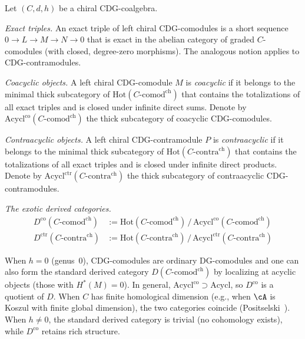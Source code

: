 \begin{definition}
\label{def:chiral-coderived}
Let $(C, d, h)$ be a chiral CDG-coalgebra.

\emph{Exact triples.}
An exact triple of left chiral CDG-comodules is a short sequence
$0 \to L \to M \to N \to 0$ that is exact in the abelian category
of graded $C$-comodules (with closed, degree-zero morphisms).
The analogous notion applies to CDG-contramodules.

\emph{Coacyclic objects.}
A left chiral CDG-comodule $M$ is \emph{coacyclic} if it belongs to
the minimal thick subcategory of $\mathrm{Hot}(C\text{-}\mathrm{comod}^{\mathrm{ch}})$
that contains the totalizations of all exact triples and is closed
under infinite direct sums.  Denote by
$\mathrm{Acycl}^{\mathrm{co}}(C\text{-}\mathrm{comod}^{\mathrm{ch}})$
the thick subcategory of coacyclic CDG-comodules.

\emph{Contraacyclic objects.}
A left chiral CDG-contramodule $P$ is \emph{contraacyclic} if it
belongs to the minimal thick subcategory of
$\mathrm{Hot}(C\text{-}\mathrm{contra}^{\mathrm{ch}})$
that contains the totalizations of all exact triples and is closed
under infinite direct products.  Denote by
$\mathrm{Acycl}^{\mathrm{ctr}}(C\text{-}\mathrm{contra}^{\mathrm{ch}})$
the thick subcategory of contraacyclic CDG-contramodules.

\emph{The exotic derived categories.}
\begin{align}
D^{\mathrm{co}}(C\text{-}\mathrm{comod}^{\mathrm{ch}})
&:= \mathrm{Hot}(C\text{-}\mathrm{comod}^{\mathrm{ch}})
\,/\, \mathrm{Acycl}^{\mathrm{co}}(C\text{-}\mathrm{comod}^{\mathrm{ch}})
\label{eq:chiral-coderived}\\
D^{\mathrm{ctr}}(C\text{-}\mathrm{contra}^{\mathrm{ch}})
&:= \mathrm{Hot}(C\text{-}\mathrm{contra}^{\mathrm{ch}})
\,/\, \mathrm{Acycl}^{\mathrm{ctr}}(C\text{-}\mathrm{contra}^{\mathrm{ch}})
\label{eq:chiral-contraderived}
\end{align}
\end{definition}

\begin{remark}
\label{rem:exotic-vs-ordinary}
When $h = 0$ (genus~$0$), CDG-comodules are ordinary DG-comodules
and one can also form the standard derived category
$D(C\text{-}\mathrm{comod}^{\mathrm{ch}})$
by localizing at acyclic objects (those with $H^*(M) = 0$).  In general,
$\mathrm{Acycl}^{\mathrm{co}} \supset \mathrm{Acycl}$,
so $D^{\mathrm{co}}$ is a quotient of $D$.  When $C$ has
finite homological dimension (e.g., when $\cA$ is Koszul with finite
global dimension), the two categories coincide
(Positselski~\cite[\S4.5]{Positselski11}).  When $h \neq 0$, the standard
derived category is trivial (no cohomology exists), while
$D^{\mathrm{co}}$ retains rich structure.
\end{remark}

